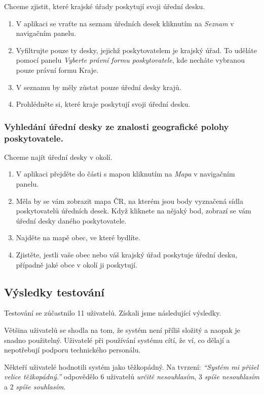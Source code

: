 Chceme zjistit, které krajské úřady poskytují svoji úřední desku.
\begin{enumerate}
    \item V aplikaci se vraťte na seznam úředních desek kliknutím na \textit{Seznam} v navigačním panelu.
    \item Vyfiltrujte pouze ty desky, jejichž poskytovatelem je krajský úřad. To uděláte pomocí panelu \textit{Vyberte právní formu poskytovatele}, kde necháte vybranou pouze právní formu Kraje.
    \item V seznamu by měly zůstat pouze úřední desky krajů.
    \item Prohlédněte si, které kraje poskytují svoji úřední desku.
\end{enumerate}

\subsubsection{Vyhledání úřední desky ze znalosti geografické polohy poskytovatele.}

Chceme najít úřední desky v okolí.
\begin{enumerate}
    \item  V aplikaci přejděte do části s mapou kliknutím na \textit{Mapa} v navigačním panelu.
    \item  Měla by se vám zobrazit mapa ČR, na kterém jsou body vyznačená sídla poskytovatelů úředních desek. Když kliknete na nějaký bod, zobrazí se vám úřední desky daného poskytovatele.
    \item Najděte na mapě obec, ve které bydlíte.
    \item Zjistěte, jestli vaše obec nebo váš krajský úřad poskytuje úřední desku, případně jaké obce v okolí ji poskytují.
\end{enumerate}


\subsection{Výsledky testování}\label{sub:vysledky-testovani}

Testování se zúčastnilo 11 uživatelů. Získali jsme následující výsledky.

Většina uživatelů se shodla na tom, že systém není příliš složitý a naopak je snadno použitelný. Uživatelé při používání systému cítí, že ví, co dělají a nepotřebují podporu technického personálu.

Někteří uživatelé hodnotili systém jako těžkopádný. Na tvrzení: \textit{``Systém mi přišel velice těžkopádný.''} odpovědělo 6 uživatelů \textit{určitě nesouhlasím}, 3 \textit{spíše nesouhlasím} a 2 \textit{spíše souhlasím}.

